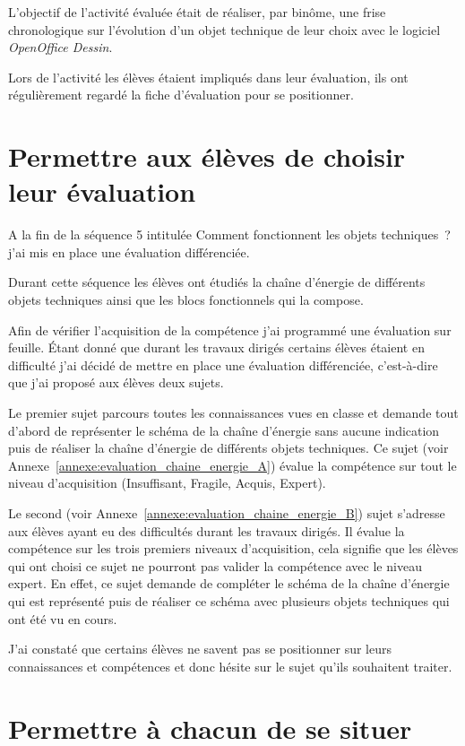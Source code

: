 L'objectif de l'activité évaluée était de réaliser, par binôme, une frise chronologique sur l'évolution d'un objet technique de leur choix avec le logiciel \textit{OpenOffice Dessin}.

Lors de l'activité les élèves étaient impliqués dans leur évaluation, ils ont régulièrement regardé la fiche d'évaluation pour se positionner.

\newpage
\section{Permettre aux élèves de choisir leur évaluation}

A la fin de la séquence 5 intitulée \og Comment fonctionnent les objets techniques~?\fg j'ai mis en place une évaluation différenciée.

Durant cette séquence les élèves ont étudiés la chaîne d'énergie de différents objets techniques ainsi que les blocs fonctionnels qui la compose.

Afin de vérifier l'acquisition de la compétence j'ai programmé une évaluation sur feuille.
Étant donné que durant les travaux dirigés certains élèves étaient en difficulté j'ai décidé de mettre en place une évaluation différenciée, c'est-à-dire que j'ai proposé aux élèves deux sujets.

Le premier sujet parcours toutes les connaissances vues en classe et demande tout d'abord de représenter le schéma de la chaîne d'énergie sans aucune indication puis de réaliser la chaîne d'énergie de différents objets techniques.
Ce sujet (voir Annexe~\ref{annexe:evaluation_chaine_energie_A}) évalue la compétence sur tout le niveau d'acquisition (Insuffisant, Fragile, Acquis, Expert).

Le second (voir Annexe~\ref{annexe:evaluation_chaine_energie_B}) sujet s'adresse aux élèves ayant eu des difficultés durant les travaux dirigés.
Il évalue la compétence sur les trois premiers niveaux d'acquisition, cela signifie que les élèves qui ont choisi ce sujet ne pourront pas valider la compétence avec le niveau expert.
En effet, ce sujet demande de compléter le schéma de la chaîne d'énergie qui est représenté puis de réaliser ce schéma avec plusieurs objets techniques qui ont été vu en cours.

J'ai constaté que certains élèves ne savent pas se positionner sur leurs connaissances et compétences et donc hésite sur le sujet qu'ils souhaitent traiter.


\newpage
\section{Permettre à chacun de se situer }

